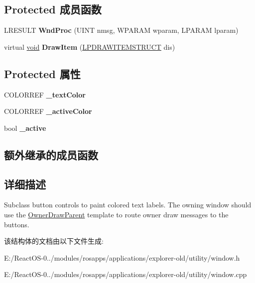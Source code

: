 \subsection*{Protected 成员函数}
\begin{DoxyCompactItemize}
\item 
\mbox{\label{struct_flat_button_a8966b09e4fcf6169a1cd20ff4dec546a}} 
L\+R\+E\+S\+U\+LT {\bfseries Wnd\+Proc} (U\+I\+NT nmsg, W\+P\+A\+R\+AM wparam, L\+P\+A\+R\+AM lparam)
\item 
\mbox{\label{struct_flat_button_aecfeb50a6bd925ad1ccc0e2593f9264b}} 
virtual \hyperlink{interfacevoid}{void} {\bfseries Draw\+Item} (\hyperlink{structtag_d_r_a_w_i_t_e_m_s_t_r_u_c_t}{L\+P\+D\+R\+A\+W\+I\+T\+E\+M\+S\+T\+R\+U\+CT} dis)
\end{DoxyCompactItemize}
\subsection*{Protected 属性}
\begin{DoxyCompactItemize}
\item 
\mbox{\label{struct_flat_button_af63af0f0f55fc65f685488f1077b990d}} 
C\+O\+L\+O\+R\+R\+EF {\bfseries \+\_\+text\+Color}
\item 
\mbox{\label{struct_flat_button_a7ace0c5778b7e357bfe6ddd322b807f3}} 
C\+O\+L\+O\+R\+R\+EF {\bfseries \+\_\+active\+Color}
\item 
\mbox{\label{struct_flat_button_a7c91f58e79dbb4cfabe993f29ccca5cc}} 
bool {\bfseries \+\_\+active}
\end{DoxyCompactItemize}
\subsection*{额外继承的成员函数}


\subsection{详细描述}
Subclass button controls to paint colored text labels. The owning window should use the \hyperlink{struct_owner_draw_parent}{Owner\+Draw\+Parent} template to route owner draw messages to the buttons. 

该结构体的文档由以下文件生成\+:\begin{DoxyCompactItemize}
\item 
E\+:/\+React\+O\+S-\/0../modules/rosapps/applications/explorer-\/old/utility/window.\+h\item 
E\+:/\+React\+O\+S-\/0../modules/rosapps/applications/explorer-\/old/utility/window.\+cpp\end{DoxyCompactItemize}
